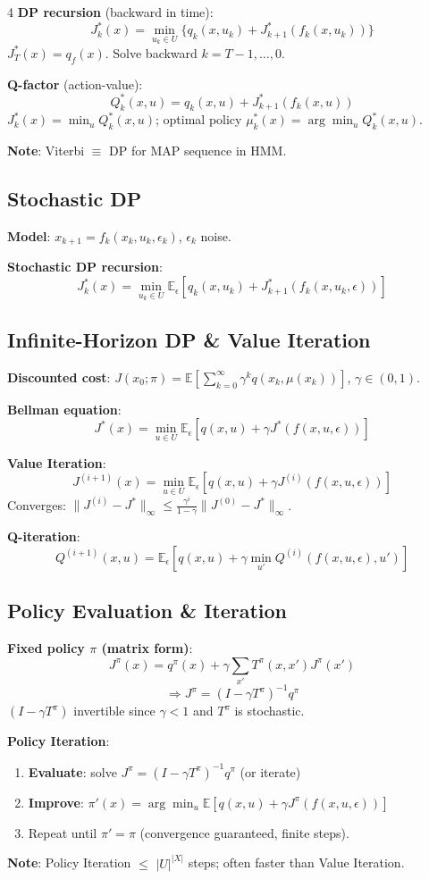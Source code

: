 \documentclass[8pt,landscape]{article}
\begin{document}
\begin{multicols}{4}
\textbf{DP recursion} (backward in time):
\[\boxed{J_k^*(x)=\min_{u_k\in U}\{q_k(x,u_k)+J_{k+1}^*(f_k(x,u_k))\}}\]
$J_T^*(x)=q_f(x)$. Solve backward $k=T-1,\ldots,0$.

\textbf{Q-factor} (action-value):
\[Q_k^*(x,u)=q_k(x,u)+J_{k+1}^*(f_k(x,u))\]
$J_k^*(x)=\min_u Q_k^*(x,u)$; optimal policy $\mu_k^*(x)=\arg\min_u Q_k^*(x,u)$.

\textbf{Note}: Viterbi $\equiv$ DP for MAP sequence in HMM.

\subsection{Stochastic DP}
\textbf{Model}: $x_{k+1}=f_k(x_k,u_k,\epsilon_k)$, $\epsilon_k$ noise.

\textbf{Stochastic DP recursion}:
\[J_k^*(x)=\min_{u_k\in U}\mathbb{E}_\epsilon\!\left[q_k(x,u_k)+J_{k+1}^*(f_k(x,u_k,\epsilon))\right]\]

\subsection{Infinite-Horizon DP \& Value Iteration}
\textbf{Discounted cost}: $J(x_0;\pi)=\mathbb{E}\!\left[\sum_{k=0}^\infty \gamma^k q(x_k,\mu(x_k))\right]$, $\gamma\in(0,1)$.

\textbf{Bellman equation}:
\[\boxed{J^*(x)=\min_{u\in U}\mathbb{E}_\epsilon\!\left[q(x,u)+\gamma J^*(f(x,u,\epsilon))\right]}\]

\textbf{Value Iteration}:
\[J^{(i+1)}(x)=\min_{u\in U}\mathbb{E}_\epsilon\!\left[q(x,u)+\gamma J^{(i)}(f(x,u,\epsilon))\right]\]
Converges: $\|J^{(i)}-J^*\|_\infty\le\frac{\gamma^i}{1-\gamma}\|J^{(0)}-J^*\|_\infty$.

\textbf{Q-iteration}:
\[Q^{(i+1)}(x,u)=\mathbb{E}_\epsilon\!\left[q(x,u)+\gamma\min_{u'}Q^{(i)}(f(x,u,\epsilon),u')\right]\]

\subsection{Policy Evaluation \& Iteration}
\textbf{Fixed policy $\pi$ (matrix form)}:
\[J^\pi(x)=q^\pi(x)+\gamma\sum_{x'}T^\pi(x,x')J^\pi(x')\]
\[\Rightarrow J^\pi=(I-\gamma T^\pi)^{-1}q^\pi\]
$(I-\gamma T^\pi)$ invertible since $\gamma<1$ and $T^\pi$ is stochastic.

\textbf{Policy Iteration}:
\begin{enumerate}
  \item \textbf{Evaluate}: solve $J^\pi=(I-\gamma T^\pi)^{-1}q^\pi$ (or iterate)
  \item \textbf{Improve}: $\pi'(x)=\arg\min_u\mathbb{E}[q(x,u)+\gamma J^\pi(f(x,u,\epsilon))]$
  \item Repeat until $\pi'=\pi$ (convergence guaranteed, finite steps).
\end{enumerate}
\textbf{Note}: Policy Iteration $\le$ $|U|^{|X|}$ steps; often faster than Value Iteration.


\end{multicols}
\end{document}
